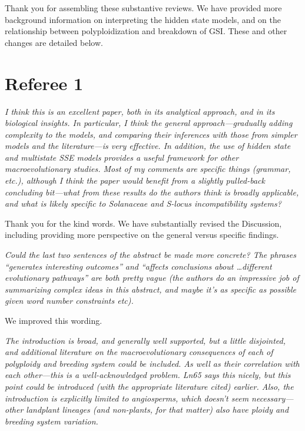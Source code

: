 \documentclass[11pt]{article}
\renewenvironment{quote}{\bigskip\noindent\itshape\ignorespaces}{\smallskip}
\begin{document}
Thank you for assembling these substantive reviews.
We have provided more background information on interpreting the hidden state models, and on the relationship between polyploidization and breakdown of GSI.
These and other changes are detailed below.

\section{Referee 1}
\vspace{-11pt}

\begin{quote}
I think this is an excellent paper, both in its analytical approach, and in its biological insights.
In particular, I think the general approach---gradually adding complexity to the models, and comparing their inferences with those from simpler models and the literature---is very effective.
In addition, the use of hidden state and multistate SSE models provides a useful framework for other macroevolutionary studies. 
Most of my comments are specific things (grammar, etc.), although I think the paper would benefit from a slightly pulled-back concluding bit---what from these results do the authors think is broadly applicable, and what is likely specific to Solanaceae and S-locus incompatibility systems?
\end{quote}

Thank you for the kind words.
We have substantially revised the Discussion, including providing more perspective on the general versus specific findings. %

\begin{quote}
Could the last two sentences of the abstract be made more concrete?
The phrases ``generates interesting outcomes'' and ``affects conclusions about \ldots different evolutionary pathways'' are both pretty vague (the authors do an impressive job of summarizing complex ideas in this abstract, and maybe it's as specific as possible given word number constraints etc).
\end{quote}

We improved this wording.

\begin{quote}
The introduction is broad, and generally well supported, but a little disjointed, and additional literature on the macroevolutionary consequences of each of polyploidy and breeding system could be included.
As well as their correlation with each other---this is a well-acknowledged problem.
Ln65 says this nicely, but this point could be introduced (with the appropriate literature cited) earlier.
Also, the introduction is explicitly limited to angiosperms, which doesn't seem necessary---other landplant lineages (and non-plants, for that matter) also have ploidy and breeding system variation.
\end{quote}
\end{document}
